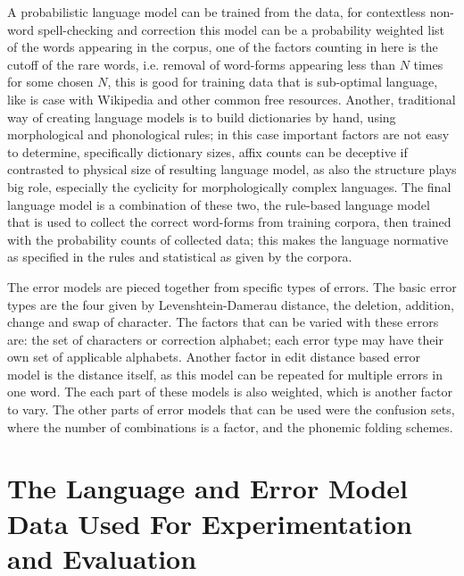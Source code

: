 \documentclass[a4paper,12pt]{article}
\begin{document}
A probabilistic language model can be trained from the data, for contextless
non-word spell-checking and correction this model can be a probability weighted
list of the words appearing in the corpus, one of the factors counting in here
is the cutoff of the rare words, i.e. removal of word-forms appearing less than
$N$ times for some chosen $N$, this is good for training data that is
sub-optimal language, like is case with Wikipedia and other common free
resources. Another, traditional way of creating language models is to build
dictionaries by hand, using morphological and phonological rules; in this case
important factors are not easy to determine, specifically dictionary sizes,
affix counts can be deceptive if contrasted to physical size of resulting
language model, as also the structure plays big role, especially the cyclicity
for morphologically complex languages. The final language model is a
combination of these two, the rule-based language model that is used to collect
the correct word-forms from training corpora, then trained with the probability
counts of collected data; this makes the language normative as specified in the
rules and statistical as given by the corpora.

The error models are pieced together from specific types of errors. The
basic error types are the four given by Levenshtein-Damerau distance, the
deletion, addition, change and swap of character. The factors that can
be varied with these errors are: the set of characters or correction
alphabet; each error type may have their own set of applicable alphabets.
Another factor in edit distance based error model is the distance itself,
as this model can be repeated for multiple errors in one word. The each part
of these models is also weighted, which is another factor to vary. The other
parts of error models that can be used were the confusion sets, where the
number of combinations is a factor, and the phonemic folding schemes.

\section{The Language and Error Model Data Used For Experimentation and
Evaluation}
\label{sec:material}
\end{document}
